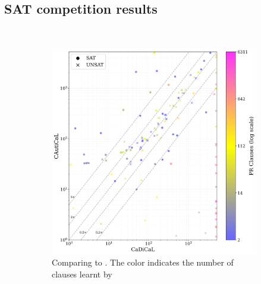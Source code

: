 \subsection{SAT competition results}~\label{subsec:eval-satcomp}

\begin{figure}[!t]
    \centering
    \begin{subfigure}[t]{0.45\textwidth}
        \centering
        \includegraphics[width=\textwidth]{figs/cadical_vs_cautical_nontrivial.jpg}
        \caption{Comparing \tool to \cadical. The color indicates the number of \pr clauses learnt by \tool}
        \label{fig:cautical-vs-cadical}
    \end{subfigure}
    \begin{subfigure}[t]{0.45\textwidth}
        \centering

\end{subfigure}
\end{figure}
